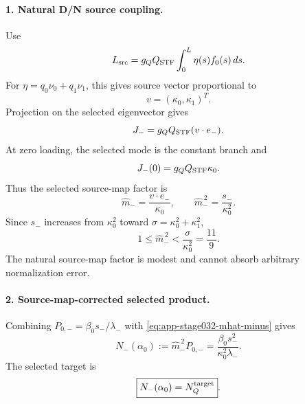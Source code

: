 \paragraph{1. Natural D/N source coupling.}
Use
\begin{equation}
\label{eq:app-stage032-source-L}
L_{\rm src}=g_QQ_{\rm STF}\int_0^L\eta(s)f_0(s)\,ds.
\end{equation}
For \(\eta=q_0\nu_0+q_1\nu_1\), this gives source vector proportional to
\begin{equation}
v=(\kappa_0,\kappa_1)^T.
\end{equation}
Projection on the selected eigenvector gives
\begin{equation}
\label{eq:app-stage032-Jminus}
J_-=g_QQ_{\rm STF}(v\cdot e_-).
\end{equation}
At zero loading, the selected mode is the constant branch and
\begin{equation}
J_-(0)=g_QQ_{\rm STF}\kappa_0.
\end{equation}
Thus the selected source-map factor is
\begin{equation}
\label{eq:app-stage032-mhat-minus}
\boxed{
\widehat m_-=\frac{v\cdot e_-}{\kappa_0},
\qquad
\widehat m_-^{\,2}=\frac{s_-}{\kappa_0^2}}.
\end{equation}
Since \(s_-\) increases from \(\kappa_0^2\) toward \(\sigma=\kappa_0^2+\kappa_1^2\),
\begin{equation}
\label{eq:app-stage032-mhat-bound}
\boxed{
1\leq\widehat m_-^{\,2}<\frac{\sigma}{\kappa_0^2}=\frac{11}{9}}.
\end{equation}
The natural source-map factor is modest and cannot absorb arbitrary normalization error.

\paragraph{2. Source-map-corrected selected product.}
Combining \(P_{0,-}=\beta_0s_-/\lambda_-\) with \eqref{eq:app-stage032-mhat-minus} gives
\begin{equation}
\label{eq:app-stage032-Nminus}
\boxed{
N_-(\alpha_0):=\widehat m_-^{\,2}P_{0,-}
=\frac{\beta_0s_-^2}{\kappa_0^2\lambda_-}}.
\end{equation}
The selected target is
\begin{equation}
\label{eq:app-stage032-Nminus-target}
\boxed{
N_-(\alpha_0)=N_Q^{\rm target}}.
\end{equation}


